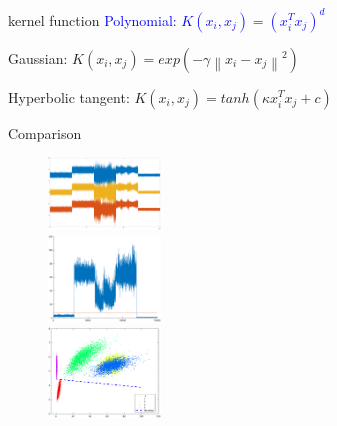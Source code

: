 \documentclass[10pt]{beamer}
\newcommand{\norm}[1]{\left\lVert#1\right\rVert}
\begin{document}
\begin{frame}{kernel function}
    \textcolor{blue}{Polynomial: $K(x_i,x_j) = (x_i^Tx_j)^d$} \par
    Gaussian:  $K(x_i,x_j) = exp(-\gamma \norm{x_i-x_j}^2)$ \par
    Hyperbolic tangent: $K(x_i,x_j) = tanh(\kappa x_i^Tx_j+c)$
    \end{frame}
    \begin{frame}{Comparison}
         \begin{figure}
        \centering
        \includegraphics[width=3cm]{fig/Coriginal.eps} \\
        \includegraphics[width=3cm]{fig/thresholdT.eps} \\
        \includegraphics[width=3cm]{fig/miniVarP.eps}
        \end{figure}
    \end{frame}
    
\end{document}
